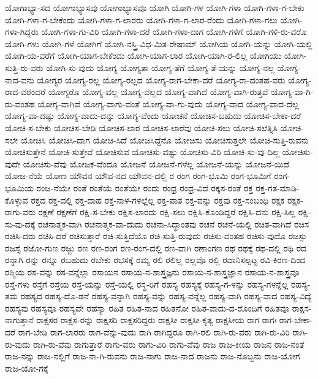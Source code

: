 {ಯೋಗಾಭ್ಯಾ-ಸದ
ಯೋಗಾಭ್ಯಾಸವು
ಯೋಗಾಭ್ಯಾಸವೂ
ಯೋಗಿ
ಯೋಗಿ-ಗಳ
ಯೋಗಿ-ಗಳಾ
ಯೋಗಿ-ಗಳಾ-ಗ-ಬೇಕು
ಯೋಗಿ-ಗಳಾ-ಗ-ಬೇಕೆಂದು
ಯೋಗಿ-ಗಳಾ-ಗ-ಲಾರರು
ಯೋಗಿ-ಗಳಾ-ಗ-ಲಾರ-ರೆಂದು
ಯೋಗಿ-ಗಳಾ-ಗಲು
ಯೋಗಿ-ಗಳಾ-ಗಿದ್ದರು
ಯೋಗಿ-ಗಳಾ-ಗು-ವಿರಿ
ಯೋಗಿ-ಗಳಾ-ದರೆ
ಯೋಗಿ-ಗಳಾ-ದಾಗ
ಯೋಗಿ-ಗಳಿಗೆ
ಯೋಗಿ-ಗಳಿ-ರು-ವರೊ
ಯೋಗಿ-ಗಳು
ಯೋಗಿ-ಗಳೆ
ಯೋಗಿಗೆ
ಯೋಗಿ-ನಸ್ತ್ರಿ-ವಿಧ-ಮಿತ-ರೇಷಾಮ್
ಯೋಗಿಯ
ಯೋಗಿ-ಯನ್ನು
ಯೋಗಿ-ಯಲ್ಲಿ
ಯೋಗಿ-ಯ-ವರೆಗೆ
ಯೋಗಿ-ಯಾಗ-ಬೇಕೆಂದು
ಯೋಗಿ-ಯಾಗ-ಲಾರ
ಯೋಗಿ-ಯಾಗಿ-ರ-ಲಿಲ್ಲ
ಯೋಗಿಯು
ಯೋಗಿ-ಸುತ್ತಿ-ರು-ವರು
ಯೋಗಿ-ಸು-ವುದು
ಯೋಗ್ಯ
ಯೋಗ್ಯತಾ
ಯೋಗ್ಯ-ತೆಗೆ
ಯೋಗ್ಯ-ತೆ-ಯನ್ನು
ಯೋಗ್ಯ-ನಲ್ಲ
ಯೋಗ್ಯ-ನಾದ-ವನು
ಯೋಗ್ಯರ
ಯೋಗ್ಯ-ರಲ್ಲ
ಯೋಗ್ಯ-ರಲ್ಲದ
ಯೋಗ್ಯ-ರಾಗ-ಬೇಕಾ-ದರೆ
ಯೋಗ್ಯ-ರಾ-ದಂತಹ-ವರು
ಯೋಗ್ಯ-ರಾದ-ವರೆಂದರೆ
ಯೋಗ್ಯರೊ
ಯೋಗ್ಯ-ವಲ್ಲ
ಯೋಗ್ಯ-ವಲ್ಲದ
ಯೋಗ್ಯ-ವಾಗಿದೆ
ಯೋಗ್ಯ-ವಾಗಿ-ರುತ್ತವೆ
ಯೋಗ್ಯ-ವಾ-ಗಿ-ರು-ವಂತಹ
ಯೋಗ್ಯ-ವಾಗಿವೆ
ಯೋಗ್ಯ-ವಾಗು-ವಂತೆ
ಯೋಗ್ಯ-ವಾ-ಗು-ವುದು
ಯೋಗ್ಯ-ವಾದ
ಯೋಗ್ಯ-ವಾದ-ದೆಲ್ಲ
ಯೋಗ್ಯ-ವಾ-ದಷ್ಟು
ಯೋಗ್ಯ-ವಾದು-ದನ್ನು
ಯೋಗ್ಯ-ವೆಂದು
ಯೋಚನೆ
ಯೋಚಿಸ-ಬಹುದು
ಯೋಚಿಸ-ಬೇಕಾ-ದರೆ
ಯೋಚಿ-ಸ-ಬೇಕು
ಯೋಚಿಸ-ಬೇಡಿ
ಯೋಚಿಸ-ಲಾರ
ಯೋಚಿಸ-ಲಾರೆವು
ಯೋಚಿ-ಸಲು
ಯೋಚಿ-ಸಲೆತ್ನಿಸಿ
ಯೋಚಿ-ಸಲೇ
ಯೋಚಿಸಿ
ಯೋಚಿಸಿ-ದಾಗ
ಯೋಚಿ-ಸಿದೆ
ಯೋಚಿಸಿದ್ದೆನೊ
ಯೋಚಿಸು
ಯೋಚಿಸುತ್ತಲೇ
ಯೋಚಿ-ಸುತ್ತಿ-ರುವನು
ಯೋಚಿಸುತ್ತೇನೆ
ಯೋಚಿ-ಸುತ್ತೇವೆ
ಯೋಚಿಸುವ
ಯೋಚಿಸು-ವಷ್ಟು
ಯೋಚಿಸು-ವಿರಿ
ಯೋಚಿ-ಸು-ವು-ದಿಲ್ಲ
ಯೋಚಿಸು-ವುದೇ
ಯೋಚಿಸು-ವೆವು
ಯೋಜಕ-ವೆಂದೂ
ಯೋಜನೆ
ಯೋಜನೆ-ಗಳೆಲ್ಲ
ಯೋಜನೆ-ಯನ್ನು
ಯೋಜನೆ-ಯಿದೆ
ಯೋಜ-ನೆಯೆ
ಯೋಣ
ಯೌವನ
ಯೌವ-ನದ
ಯೌವನ-ದಲ್ಲಿ
ರ
ರಂಗ
ರಂಗ-ಭೂಮಿ
ರಂಗ-ಭೂಮಿಗೆ
ರಂಗ-ಭೂಮಿಯ
ರಂಜ-ನೆಯೇ
ರಂತೆ
ರಂತೆಯೆ
ರಂತೆಯೇ
ರಂದು
ರಂಧ್ರ
ರಂಧ್ರ-ವಿದೆ
ರಕ್ಕಸ-ರಂತೆ
ರಕ್ತ
ರಕ್ತ-ಗತ-ಮಾಡಿ-ಕೊಳ್ಳುವ
ರಕ್ತದ
ರಕ್ತ-ದಲ್ಲಿ
ರಕ್ತ-ದಾಹ
ರಕ್ತ-ನಾಳ-ಗಳಲ್ಲೆಲ್ಲ
ರಕ್ತ-ಪಾತ
ರಕ್ತ-ವನ್ನು
ರಕ್ತವು
ರಕ್ತ-ಸಂಬಂಧಿ
ರಕ್ಷಕ
ರಕ್ಷಕ-ರಾಗು-ವರು
ರಕ್ಷಣೆ
ರಕ್ಷಣೆಗೆ
ರಕ್ಷಿ-ಸ-ಬೇಕು
ರಕ್ಷಿಸ-ಲಾರದು
ರಕ್ಷಿ-ಸಲು
ರಕ್ಷಿಸಿ-ಕೊಂಡಿದ್ದರೆ
ರಕ್ಷಿಸಿ-ದನು
ರಕ್ಷಿ-ಸಿಲ್ಲ
ರಕ್ಷಿ-ಸು-ವು-ದಕ್ಕೆ
ರಚನಾತ್ಮಕ-ವಾಗಿ
ರಚನಾತ್ಮಕ-ವಾ-ದುದು
ರಚನಾ-ಸಿದ್ಧಾಂತವು
ರಚನೆ
ರಚನೆ-ಯಲ್ಲಿ
ರಚಿತ-ವಾಗಿದೆ
ರಚಿಸ
ರಚಿಸಿ-ದರು
ರಚಿಸಿ-ದರೆ
ರಚಿಸುತ್ತಾರೆ
ರಚಿ-ಸುತ್ತಿದೆಯೊ
ರಚಿ-ಸುತ್ತಿ-ರುವುದು
ರಚಿಸು-ವಂತಹ
ರಚಿಸು-ವುದೊ
ರಜಸ್ಸು
ರಜಸ್ಸೆ
ರಜೋ-ಗುಣ
ರಜ್ಜು
ರಣ
ರಣ-ರಂಗ
ರಣ-ರಂಗ-ದಲ್ಲಿ
ರಣ-ವಾಗಿ
ರಣಾಂಗಣ
ರಥ
ರಥಕ್ಕೆ
ರಥ-ದಲ್ಲಿ
ರಥಿ
ರದ
ರನ್ನಾಗಿ
ರನ್ನು
ರನ್ನೂ
ರಬಹುದು
ರಬೇಕು
ರಭಸಕ್ಕೆ
ರಮ್ಯ
ರಲಿ
ರಲಿಲ್ಲ
ರಲ್ಲವೊ
ರಲ್ಲಿ
ರವಾನಿಸಲ್ಪಟ್ಟ
ರವಿ-ಕಿರಣ-ದಿಂದ
ರಶ್ಮಿಯ
ರಸ-ವನ್ನು
ರಸ-ವನ್ನೆಲ್ಲಾ
ರಸಾಯನ
ರಸಾಯ-ನ-ಶಾಸ್ತ್ರಜ್ಞನು
ರಸಾಯ-ನ-ಶಾಸ್ತ್ರಜ್ಞಾನ
ರಸಾಯ-ನ-ಶಾಸ್ತ್ರವೂ
ರಸ್ತೆ-ಗಳು
ರಸ್ತೆಗೆ
ರಸ್ತೆಯ
ರಸ್ತೆ-ಯನ್ನು
ರಸ್ತೆ-ಯಲ್ಲಿ
ರಸ್ಥ-ರಿಗೆ
ರಹಸ್ಯ
ರಹಸ್ಯಕ್ಕೆ
ರಹಸ್ಯ-ಗ-ಳನ್ನು
ರಹಸ್ಯ-ಗಳನ್ನೆಲ್ಲ
ರಹಸ್ಯ-ತಮ
ರಹಸ್ಯದ
ರಹಸ್ಯ-ದೊ-ಡನೆ
ರಹಸ್ಯ-ವನ್ನಾಗಿ
ರಹಸ್ಯ-ವನ್ನು
ರಹಸ್ಯ-ವನ್ನೆಲ್ಲ
ರಹಸ್ಯ-ವಾಗಿ
ರಹಸ್ಯ-ವಾದ
ರಹಸ್ಯ-ವಿದ್ಯೆ
ರಹಸ್ಯವು
ರಹಸ್ಯವೂ
ರಹಸ್ಯವೇ
ರಹಸ್ಯಾ
ರಹಿತ
ರಹಿತ-ನಾದ
ರಹಿತನೋ
ರಹಿತ-ವಾದು-ದ-ರೊಂದಿಗೆ
ರಹಿತವೂ
ರಾಕ್ಷಸ-ನಾಗುತ್ತಾನೆ
ರಾಕ್ಷಸರ
ರಾಕ್ಷಸ-ರನ್ನು
ರಾಕ್ಷಸರಿ
ರಾಕ್ಷಸರಿದ್ದರು
ರಾಕ್ಷಸೀ
ರಾಕ್ಷಸೀ-ಕೃತ್ಯ
ರಾಕ್ಷಸೀಯ
ರಾಗ
ರಾಗಃ
ರಾಗ-ಬೇಕಾ-ದರೆ
ರಾಗ-ಬೇಡಿ
ರಾಗ-ಲಾರರು
ರಾಗ-ವೆನ್ನು-ವುದು
ರಾಗಿ
ರಾಗಿದ್ದರೂ
ರಾಗಿ-ರಲಿ
ರಾಗಿ-ರು-ವರು
ರಾಗಿ-ರು-ವಿರಿ
ರಾಗಿ-ರು-ವುದು
ರಾಗಿ-ರು-ವೆವು
ರಾಗುತ್ತಾರೆ
ರಾಗು-ವರು
ರಾಗು-ವಿರಿ
ರಾಗು-ವೆವು
ರಾಜ
ರಾಜ-ಕೀಯ
ರಾಜನ
ರಾಜ-ನಂತೆ
ರಾಜ-ನನ್ನು
ರಾಜ-ನಲ್ಲಿಗೆ
ರಾಜ-ನಾ-ಗಿ-ರುವನು
ರಾಜ-ನಾಗು
ರಾಜ-ನಾದ
ರಾಜನು
ರಾಜ-ನೊಬ್ಬನು
ರಾಜ-ಯೋಗ
ರಾಜ-ಯೋ-ಗಕ್ಕೆ
}
